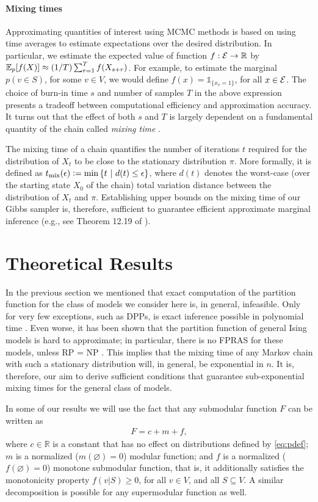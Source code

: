 \paragraph{Mixing times}
Approximating quantities of interest using MCMC methods is based on using time averages to estimate expectations over the desired distribution.
In particular, we estimate the expected value of function $f : \ss \to \mathbb{R}$ by $\E_p[f(X)] \approx (1/T)\sum_{r=1}^{T} f(X_{s + r})$.
For example, to estimate the marginal $p(v \in S)$, for some $v \in V$, we would define $f(x) = \mathds{1}_{\{x_v = 1\}}$, for all $x \in \ss$.
The choice of burn-in time $s$ and number of samples $T$ in the above expression presents a tradeoff between computational efficiency and approximation accuracy.
It turns out that the effect of both $s$ and $T$ is largely dependent on a fundamental quantity of the chain called \emph{mixing time} \cite{levin08}.

The mixing time of a chain quantifies the number of iterations $t$ required for the distribution of $X_t$ to be close to the stationary distribution $\pi$.
More formally, it is defined as $\tme \defeq \min \sdef{t}{d(t) \leq \epsilon}$, where $d(t)$ denotes the worst-case (over the starting state $X_0$ of the chain) total variation distance between the distribution of $X_t$ and $\pi$.
Establishing upper bounds on the mixing time of our Gibbs sampler is, therefore, sufficient to guarantee efficient approximate marginal inference (e.g., see Theorem 12.19 of \citet{levin08}).

\section{Theoretical Results}
In the previous section we mentioned that exact computation of the partition function for the class of models we consider here is, in general, infeasible.
Only for very few exceptions, such as DPPs, is exact inference possible in polynomial time \cite{kulesza12}.
Even worse, it has been shown that the partition function of general Ising models is hard to approximate; in particular, there is no FPRAS for these models, unless RP = NP \cite{jerrum93}.
This implies that the mixing time of any Markov chain with such a stationary distribution will, in general, be exponential in $n$.
It is, therefore, our aim to derive sufficient conditions that guarantee sub-exponential mixing times for the general class of models.

In some of our results we will use the fact that any submodular function $F$ can be written as
\begin{align} \label{eq:decomp}
  F = c + m + f,
\end{align}
where $c \in \mathbb{R}$ is a constant that has no effect on distributions defined by \eqref{eq:pdef}; $m$ is a normalized ($m(\varnothing) = 0$) modular function; and $f$ is a normalized ($f(\varnothing) = 0$) monotone submodular function, that is, it additionally satisfies the monotonicity property $f(v|S) \geq 0$, for all $v \in V$, and all $S \subseteq V$.
A similar decomposition is possible for any supermodular function as well.

